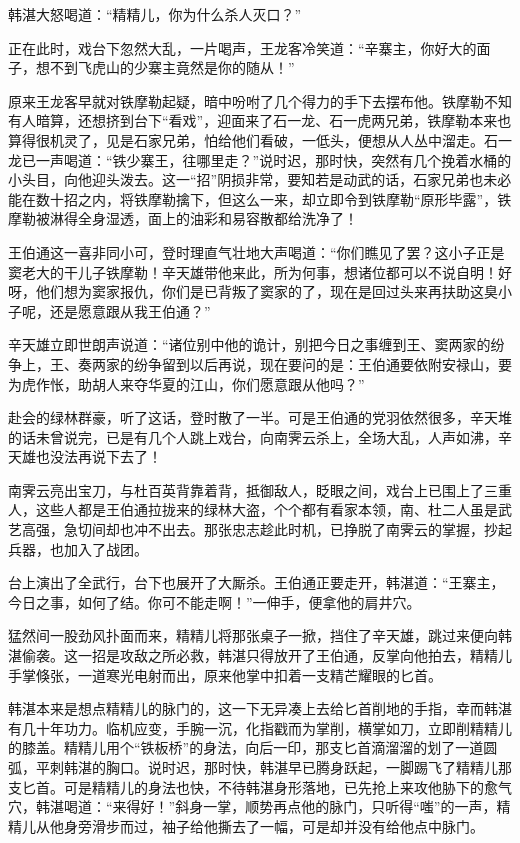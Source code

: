 \documentclass[12pt,oneside]{book}
\begin{document}
韩湛大怒喝道：``精精儿，你为什么杀人灭口？''

正在此时，戏台下忽然大乱，一片喝声，王龙客冷笑道：``辛寨主，你好大的面子，想不到飞虎山的少寨主竟然是你的随从！''

原来王龙客早就对铁摩勒起疑，暗中吩咐了几个得力的手下去摆布他。铁摩勒不知有人暗算，还想挤到台下``看戏''，迎面来了石一龙、石一虎两兄弟，铁摩勒本来也算得很机灵了，见是石家兄弟，怕给他们看破，一低头，便想从人丛中溜走。石一龙已一声喝道：``铁少寨王，往哪里走？''说时迟，那时快，突然有几个挽着水桶的小头目，向他迎头泼去。这一``招''阴损非常，要知若是动武的话，石家兄弟也未必能在数十招之内，将铁摩勒擒下，但这么一来，却立即令到铁摩勒``原形毕露''，铁摩勒被淋得全身湿透，面上的油彩和易容散都给洗净了！

王伯通这一喜非同小可，登时理直气壮地大声喝道：``你们瞧见了罢？这小子正是窦老大的干儿子铁摩勒！辛天雄带他来此，所为何事，想诸位都可以不说自明！好呀，他们想为窦家报仇，你们是已背叛了窦家的了，现在是回过头来再扶助这臭小子呢，还是愿意跟从我王伯通？''

辛天雄立即世朗声说道：``诸位别中他的诡计，别把今日之事缠到王、窦两家的纷争上，王、奏两家的纷争留到以后再说，现在要问的是：王伯通要依附安禄山，要为虎作怅，助胡人来夺华夏的江山，你们愿意跟从他吗？''

赴会的绿林群豪，听了这话，登时散了一半。可是王伯通的党羽依然很多，辛天堆的话未曾说完，已是有几个人跳上戏台，向南霁云杀上，全场大乱，人声如沸，辛天雄也没法再说下去了！

南霁云亮出宝刀，与杜百英背靠着背，抵御敌人，眨眼之间，戏台上已围上了三重人，这些人都是王伯通拉拢来的绿林大盗，个个都有看家本领，南、杜二人虽是武艺高强，急切间却也冲不出去。那张忠志趁此时机，已挣脱了南霁云的掌握，抄起兵器，也加入了战团。

台上演出了全武行，台下也展开了大厮杀。王伯通正要走开，韩湛道：``王寨主，今日之事，如何了结。你可不能走啊！''一伸手，便拿他的肩井穴。

猛然间一股劲风扑面而来，精精儿将那张桌子一掀，挡住了辛天雄，跳过来便向韩湛偷袭。这一招是攻敌之所必救，韩湛只得放开了王伯通，反掌向他拍去，精精儿手掌倏张，一道寒光电射而出，原来他掌中扣着一支精芒耀眼的匕首。

韩湛本来是想点精精儿的脉门的，这一下无异凑上去给匕首削地的手指，幸而韩湛有几十年功力。临机应变，手腕一沉，化指戳而为掌削，横掌如刀，立即削精精儿的膝盖。精精儿用个``铁板桥''的身法，向后一印，那支匕首滴溜溜的划了一道圆弧，平刺韩湛的胸口。说时迟，那时快，韩湛早已腾身跃起，一脚踢飞了精精儿那支匕首。可是精精儿的身法也快，不待韩湛身形落地，已先抢上来攻他胁下的愈气穴，韩湛喝道：``来得好！''斜身一掌，顺势再点他的脉门，只听得``嗤''的一声，精精儿从他身旁滑步而过，袖子给他撕去了一幅，可是却并没有给他点中脉门。
\end{document}
